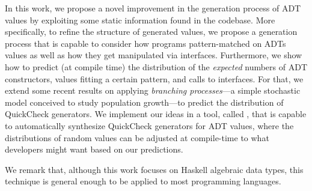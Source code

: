 In this work, we propose a novel improvement in the generation process of ADT
values by exploiting some static information found in the codebase.
%
More specifically, to refine the structure of generated values, we propose a
generation process that is capable to consider how programs pattern-matched on
ADTs values as well as how they get manipulated via interfaces.
%
Furthermore, we show how to predict (at compile time) the distribution of the
\emph{expected} numbers of ADT constructors, values fitting a certain pattern,
and calls to interfaces.
%
For that, we extend some recent results on applying \emph{branching
  processes}---a simple stochastic model conceived to study population
growth---to predict the distribution of QuickCheck
generators\cite{DBLP:conf/haskell/MistaRH18}.
%
We implement our ideas in a tool, called {\dragenp}, that is capable to
automatically synthesize QuickCheck generators for ADT values, where the
distributions of random values can be adjusted at compile-time to what
developers might want based on our predictions.
%

We remark that, although this work focuses on Haskell algebraic data types, this
technique is general enough to be applied to most programming languages.


